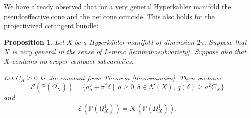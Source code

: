 \documentclass[JEP,XML,SOM,Unicode,NoEqCountersInSection,published]{cedram}
\let\mathcal\mathscr
\theoremstyle{plain}
\newtheorem{proposition}[theorem]{Proposition}
\theoremstyle{definition}
\newcommand{\PP}{\ensuremath{\mathbb{P}}}
\begin{document}
We have already observed that for a very general Hyperkähler manifold
the pseudoeffective cone and the nef cone coincide.
This also holds for the projectivized cotangent bundle:

\begin{proposition} \label{propositionpseffcone}
Let $X$ be a Hyperkähler manifold of dimension $2n$. Suppose that~$X$ is very general in the sense of Lemma \ref{lemmanosubvariety}.
Suppose also that
$X$ contains no proper compact subvarieties.

Let $C_X \geq 0$ be the constant from Theorem \ref{theoremmain}.
Then we have
\begin{equation} \label{formulapseffcone}
\mathcal{E}(\PP(\Omega_X^1))=\{ a\zeta+\pi^* \delta \mid\ a\geq 0, \delta\in \overline{\mathcal{K}(X)},\ q(\delta)\geq a^2 C_X \}
\end{equation}
and 
\[
\mathcal{E}(\PP(\Omega_X^1))=\overline{\mathcal{K}(\PP(\Omega_X^1))}.
\]
\end{proposition}
\end{document}
